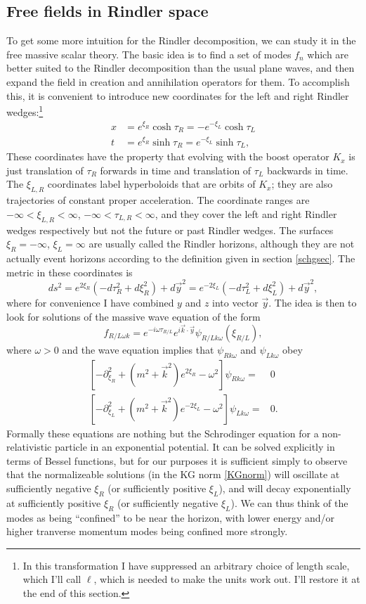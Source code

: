 \documentclass[12pt]{article}
\newcommand{\be}{\begin{equation}}
\newcommand{\ee}{\end{equation}}
\begin{document}
\subsection{Free fields in Rindler space}\label{rindsec2}
To get some more intuition for the Rindler decomposition, we can study it in the free massive scalar theory.  The basic idea is to find a set of modes $f_n$ which are better suited to the Rindler decomposition than the usual plane waves, and then expand the field in creation and annihilation operators for them.  To accomplish this, it is convenient to introduce new coordinates for the left and right Rindler wedges:\footnote{In this transformation I have suppressed an arbitrary choice of length scale, which I'll call $\ell$, which is needed to make the units work out.  I'll restore it at the end of this section.}
\begin{align}\nonumber
x&=e^{\xi_R}\cosh \tau_R=-e^{-\xi_L}\cosh \tau_L\\
t&=e^{\xi_R}\sinh \tau_R=e^{-\xi_L}\sinh\tau_L,\label{rindcoord}
\end{align}
These coordinates have the property that evolving with the boost operator $K_x$ is just translation of $\tau_R$ forwards in time and translation of $\tau_L$ backwards in time.  The $\xi_{L,R}$ coordinates label hyperboloids that are orbits of $K_x$; they are also trajectories of constant proper acceleration.  The coordinate ranges are $-\infty<\xi_{L,R}<\infty$, $-\infty<\tau_{L,R}<\infty$, and they cover the left and right Rindler wedges respectively but not the future or past Rindler wedges.  The surfaces $\xi_R=-\infty$, $\xi_L=\infty$ are usually called the Rindler horizons, although they are not actually event horizons according to the definition given in section \ref{schgsec}.  The metric in these coordinates is
\be\label{rindmec}
ds^2=e^{2\xi_R}(-d\tau_R^2+d\xi_R^2)+d\vec{y}^2=e^{-2\xi_L}(-d\tau_L^2+d\xi_L^2)+d\vec{y}^2,
\ee
where for convenience I have combined $y$ and $z$ into vector $\vec{y}$.  
The idea is then to look for solutions of the massive wave equation
of the form
\be\label{rindlermode}
f_{R/L\omega k}=e^{-i\omega\tau_{R/L}}e^{i\vec{k}\cdot \vec{y}}\psi_{R/Lk\omega}(\xi_{R/L}),
\ee
where $\omega>0$ and the wave equation implies that $\psi_{Rk\omega}$ and $\psi_{Lk\omega}$ obey
\begin{align}\nonumber
\left[-\partial_{\xi_R}^2+(m^2+\vec{k}^2)e^{2\xi_R}-\omega^2\right]\psi_{Rk\omega}=&0\\
\left[-\partial_{\xi_L}^2+(m^2+\vec{k}^2)e^{-2\xi_L}-\omega^2\right]\psi_{Lk\omega}=&0.
\end{align}
Formally these equations are nothing but the Schrodinger equation for a non-relativistic particle in an exponential potential.  It can be solved explicitly in terms of Bessel functions, but for our purposes it is sufficient simply to observe that the normalizeable solutions (in the KG norm \eqref{KGnorm}) will oscillate at sufficiently negative $\xi_R$ (or sufficiently positive $\xi_L$), and will decay exponentially at sufficiently positive $\xi_R$ (or sufficiently negative $\xi_L$).  We can thus think of the modes as being ``confined'' to be near the horizon, with lower energy and/or higher tranverse momentum modes being confined more strongly.  
\end{document}
